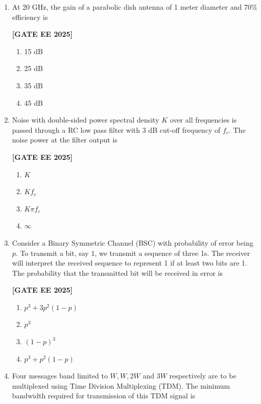 \documentclass[12pt]{article}
\begin{document}
\begin{enumerate}[leftmargin=*, label=\textbf{Q.\arabic*:}]
\item At 20 GHz, the gain of a parabolic dish antenna of 1 meter diameter and 70\% efficiency is
 
\noindent \textbf{[GATE EE 2025]}
\begin{multicols}{4}
\begin{enumerate}
  \item 15 dB
  \item 25 dB
  \item 35 dB
  \item 45 dB
\end{enumerate}
\end{multicols}

\item Noise with double-sided power spectral density $K$ over all frequencies is passed through a RC low pass filter with 3 dB cut-off frequency of $f_c$. The noise power at the filter output is
 
\noindent \textbf{[GATE EE 2025]}
\begin{multicols}{4}
\begin{enumerate}
  \item $K$
  \item $K f_c$
  \item $K \pi f_c$
  \item $\infty$
\end{enumerate}
\end{multicols}

\item Consider a Binary Symmetric Channel (BSC) with probability of error being $p$. To transmit a bit, say 1, we transmit a sequence of three 1s. The receiver will interpret the received sequence to represent 1 if at least two bits are 1. The probability that the transmitted bit will be received in error is
 
\noindent \textbf{[GATE EE 2025]}
\begin{multicols}{2}
\begin{enumerate}
  \item $p^3 + 3p^2(1-p)$
  \item $p^3$
  \item $(1-p)^3$
  \item $p^3 + p^2(1-p)$
\end{enumerate}
\end{multicols}

\item Four messages band limited to $W, W, 2W$ and $3W$ respectively are to be multiplexed using Time Division Multiplexing (TDM). The minimum bandwidth required for transmission of this TDM signal is
 

\end{enumerate}
\end{document}
